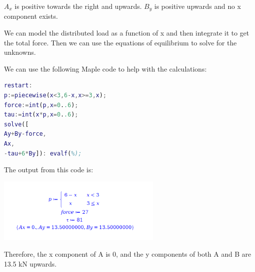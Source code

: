 \documentclass{article}[14pt, letterpaper, Times New Roman]
\begin{document}
$A_x$ is positive towards the right and upwards. $B_y$ is positive upwards and no x component exists.

We can model the distributed load as a function of x and then integrate it to get the total force.
Then we can use the equations of equilibrium to solve for the unknowns.

We can use the following Maple code to help with the calculations:

\begin{lstlisting}[language=matlab]
restart: 
p:=piecewise(x<3,6-x,x>=3,x);
force:=int(p,x=0..6);
tau:=int(x*p,x=0..6);
solve([
Ay+By-force,
Ax,
-tau+6*By]): evalf(%);
\end{lstlisting}

The output from this code is:

\includegraphics[width=8cm]{l11-pbq-o.png}

Therefore, the x component of A is 0, and the y components of both A and B are 13.5 kN upwards.
\end{document}
